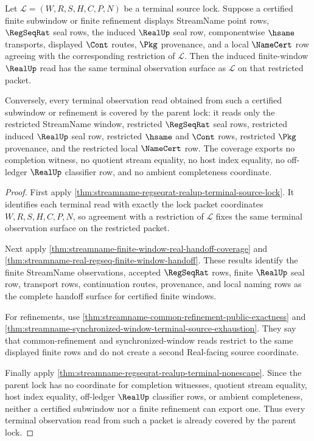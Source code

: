 \begin{theorem}
\label{thm:streamname-regseqrat-real-terminal-observation-coverage}
Let $\mathcal{L}=(W,R,S,H,C,P,N)$ be a terminal source lock. Suppose a
certified finite subwindow or finite refinement displays StreamName point rows,
$\RegSeqRat$ seal rows, the induced $\RealUp$ seal row, componentwise
$\hsame$ transports, displayed $\Cont$ routes, $\Pkg$ provenance, and a local
$\NameCert$ row agreeing with the corresponding restriction of
$\mathcal{L}$. Then the induced finite-window $\RealUp$ read has the same
terminal observation surface as $\mathcal{L}$ on that restricted packet.

Conversely, every terminal observation read obtained from such a certified
subwindow or refinement is covered by the parent lock: it reads only the
restricted StreamName window, restricted $\RegSeqRat$ seal rows, restricted
induced $\RealUp$ seal row, restricted $\hsame$ and $\Cont$ rows, restricted
$\Pkg$ provenance, and the restricted local $\NameCert$ row. The coverage
exports no completion witness, no quotient stream equality, no host index
equality, no off-ledger $\RealUp$ classifier row, and no ambient completeness
coordinate.
\end{theorem}
\begin{proof}
First apply
\autoref{thm:streamname-regseqrat-realup-terminal-source-lock}. It identifies
each terminal read with exactly the lock packet coordinates
$W,R,S,H,C,P,N$, so agreement with a restriction of $\mathcal{L}$ fixes the
same terminal observation surface on the restricted packet.

Next apply \autoref{thm:streamname-finite-window-real-handoff-coverage} and
\autoref{thm:streamname-real-regseq-finite-window-handoff}. These results
identify the finite StreamName observations, accepted $\RegSeqRat$ rows,
finite $\RealUp$ seal row, transport rows, continuation routes, provenance,
and local naming rows as the complete handoff surface for certified finite
windows.

For refinements, use \autoref{thm:streamname-common-refinement-public-exactness}
and \autoref{thm:streamname-synchronized-window-terminal-source-exhaustion}.
They say that common-refinement and synchronized-window reads restrict to the
same displayed finite rows and do not create a second Real-facing source
coordinate.

Finally apply
\autoref{thm:streamname-regseqrat-realup-terminal-nonescape}. Since the parent
lock has no coordinate for completion witnesses, quotient stream equality,
host index equality, off-ledger $\RealUp$ classifier rows, or ambient
completeness, neither a certified subwindow nor a finite refinement can export
one. Thus every terminal observation read from such a packet is already
covered by the parent lock.
\end{proof}
